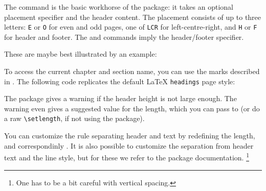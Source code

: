 The  command is the basic workhorse of the package:
it takes an optional placement specifier and the header content.
The placement consists of up to three letters:
\verb|E| or \verb|O| for even and odd pages, one of \verb|LCR| for left-centre-right,
and \verb|H| or \verb|F| for header and footer.
The  and  commands imply the header/footer specifier.

These are maybe best illustrated by an example:
%
\begin{ExampleCode}
\pagestyle{fancy}

\fancyhf[]{}

\fancyfoot[C]{\thepage}

\end{ExampleCode}

To access the current chapter and section name,
you can use the marks described in .
The following code replicates the default \LaTeX{} \verb|headings| page style:
%
\begin{ExampleCode}
\pagestyle{fancy}

\fancyhf[]{}

\fancyhead[LE,RO]{\thepage}

\fancyhead[RE]{\leftmark}
\fancyhead[LO]{\rightmark}
\end{ExampleCode}


\begin{remark}
The package gives a warning if the header height is not large enough.
The warning even gives a suggested value for the  length,
which you can pass to  (or do a raw \verb|\setlength|, if not using the package).
\end{remark}

You can customize the rule separating header and text by redefining the
 length, and correspondinly .
It is also possible to customize the separation from header text and the line style,
but for these we refer to the package documentation.%
\footnote{One has to be a bit careful with vertical spacing.}
